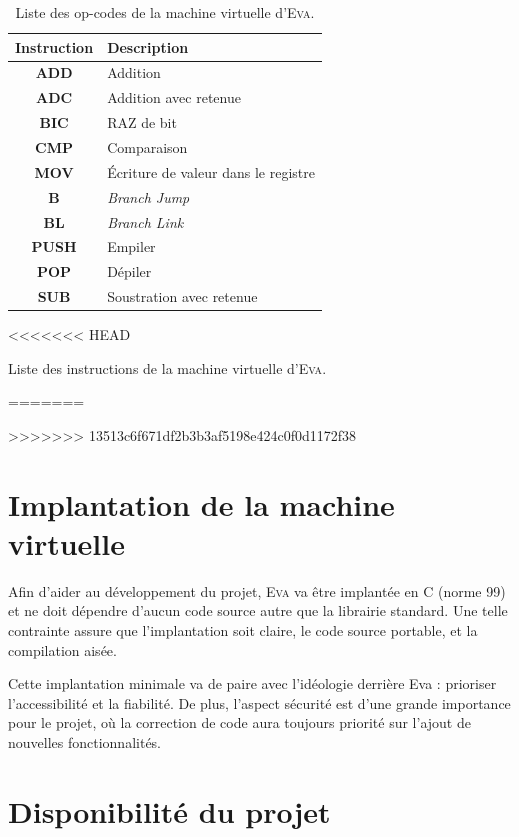 \documentclass[11pt,twoside,french]{article}
\newcommand{\noun}[1]{\textsc{#1}}
\begin{document}
\begin{table}[bp]
\begin{centering}
\begin{tabular}{|c|l|}
\hline
\textbf{Instruction} & \textbf{Description}\\
\hline
\hline
\textbf{ADD} & Addition\\
\hline
\textbf{ADC} & Addition avec retenue\\
\hline
\textbf{BIC} & RAZ de bit\\
\hline
\textbf{CMP} & Comparaison\\
\hline
\textbf{MOV} & Écriture de valeur dans le registre\\
\hline
\textbf{B} & \emph{Branch Jump}\\
\hline
\textbf{BL} & \emph{Branch Link}\\
\hline
\textbf{PUSH} & Empiler\\
\hline
\textbf{POP} & Dépiler\\
\hline
\textbf{SUB} & Soustration avec retenue\\
\hline
\end{tabular}
\par\end{centering}
<<<<<<< HEAD
\caption{\label{tab:opcodes}Liste des instructions de la machine virtuelle d'\noun{Eva}.}
=======
\caption{Liste des op-codes de la machine virtuelle d'\noun{Eva}.}
\label{tab:opcodes}
>>>>>>> 13513c6f671df2b3b3af5198e424c0f0d1172f38
\end{table}


\section{Implantation de la machine virtuelle}

Afin d'aider au développement du projet, \noun{Eva} va être implantée
en C (norme 99) et ne doit dépendre d'aucun code source autre que
la librairie standard. Une telle contrainte assure que l'implantation
soit claire, le code source portable, et la compilation aisée.

Cette implantation minimale va de paire avec l'idéologie derrière
Eva : prioriser l'accessibilité et la fiabilité. De plus, l'aspect
sécurité est d'une grande importance pour le projet, où la correction
de code aura toujours priorité sur l'ajout de nouvelles fonctionnalités.

\section{Disponibilité du projet}
\end{document}
